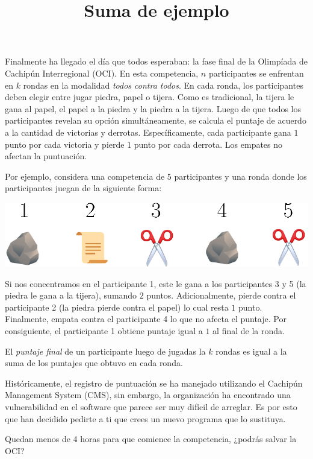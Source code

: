 \documentclass{oci}
\title{Suma de ejemplo}
\begin{document}
\begin{problemDescription}
  Finalmente ha llegado el día que todos esperaban:
  la fase final de la Olimpíada de Cachipún Interregional (OCI).
  En esta competencia, $n$ participantes se enfrentan en $k$ rondas
  en la modalidad \emph{todos contra todos}.
  En cada ronda, los participantes deben elegir entre jugar piedra, papel o tijera.
  Como es tradicional, la tijera le gana al papel, el papel a la piedra y la piedra a
  la tijera.
  Luego de que todos los participantes revelan su opción simultáneamente, se
  calcula el puntaje de acuerdo a la cantidad de victorias y derrotas.
  Específicamente, cada participante gana $1$ punto por cada victoria
  y pierde $1$ punto por cada derrota.
  Los empates no afectan la puntuación.

  Por ejemplo, considera una competencia de $5$ participantes y una ronda donde
  los participantes juegan de la siguiente forma:
  \begin{center}
    \includegraphics[scale=0.8]{ronda.eps}
  \end{center}
  Si nos concentramos en el participante 1, este le gana a los participantes 3 y 5
  (la piedra le gana a la tijera), sumando $2$ puntos.
  Adicionalmente, pierde contra el participante 2 (la piedra pierde contra el papel)
  lo cual resta $1$ punto.
  Finalmente, empata contra el participante 4 lo que no afecta el puntaje.
  Por consiguiente, el participante 1 obtiene puntaje igual a $1$ al final de la ronda.

  El \emph{puntaje final} de un participante luego de jugadas la $k$ rondas
  es igual a la suma de los puntajes que obtuvo en cada ronda.

  Históricamente, el registro de puntuación se ha manejado utilizando el
  Cachipún Management System (CMS), sin embargo, la organización ha encontrado
  una vulnerabilidad en el software que parece ser muy difícil de arreglar.
  Es por esto que han decidido pedirte a ti que crees un nuevo programa que lo
  sustituya.

  Quedan menos de 4 horas para que comience la competencia, ¿podrás salvar la OCI?
\end{problemDescription}
\end{document}
